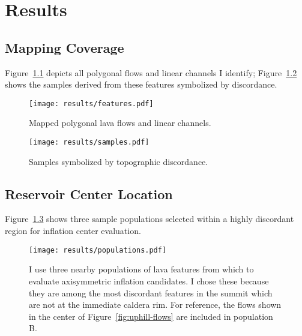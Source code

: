 \chapter{Results}\label{cha:results}

\section{Mapping Coverage}

Figure~\ref{fig:features} depicts all polygonal flows and linear channels I identify; Figure~\ref{fig:samples} shows the samples derived from these features symbolized by discordance.

\begin{figure}
    \texttt{[image: results/features.pdf]}%
    \caption[Mapped lava features]{Mapped polygonal lava flows and linear channels.}%
    \label{fig:features}
\end{figure}

\begin{figure}
    \texttt{[image: results/samples.pdf]}%
    \caption[Mapped topographic discordance]{Samples symbolized by topographic discordance.}%
    \label{fig:samples}
\end{figure}

\section{Reservoir Center Location}

Figure~\ref{fig:populations} shows three sample populations selected within a highly discordant region for inflation center evaluation.

\begin{figure}
    \texttt{[image: results/populations.pdf]}%
    \caption[Sample populations for inflation center evaluation]{I use three nearby populations of lava features from which to evaluate axisymmetric inflation candidates. I chose these because they are among the most discordant features in the summit which are not at the immediate caldera rim. For reference, the flows shown in the center of Figure~\ref{fig:uphill-flows} are included in population B.}%
    \label{fig:populations}
\end{figure}

